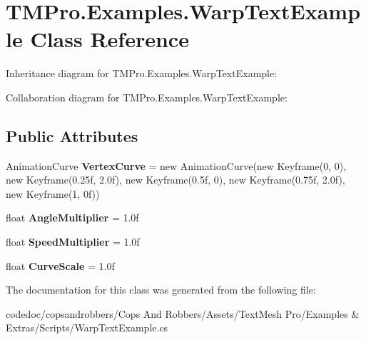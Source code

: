 \hypertarget{classTMPro_1_1Examples_1_1WarpTextExample}{}\section{T\+M\+Pro.\+Examples.\+Warp\+Text\+Example Class Reference}
\label{classTMPro_1_1Examples_1_1WarpTextExample}


Inheritance diagram for T\+M\+Pro.\+Examples.\+Warp\+Text\+Example\+:


Collaboration diagram for T\+M\+Pro.\+Examples.\+Warp\+Text\+Example\+:
\subsection*{Public Attributes}
\begin{DoxyCompactItemize}
\item 
\mbox{\label{classTMPro_1_1Examples_1_1WarpTextExample_aa95fcb47fe116dd3890a0f92106a6602}} 
Animation\+Curve {\bfseries Vertex\+Curve} = new Animation\+Curve(new Keyframe(0, 0), new Keyframe(0.\+25f, 2.\+0f), new Keyframe(0.\+5f, 0), new Keyframe(0.\+75f, 2.\+0f), new Keyframe(1, 0f))
\item 
\mbox{\label{classTMPro_1_1Examples_1_1WarpTextExample_a99104ed4ea6b2676485a40e555388f54}} 
float {\bfseries Angle\+Multiplier} = 1.\+0f
\item 
\mbox{\label{classTMPro_1_1Examples_1_1WarpTextExample_ae02c88a8c8958d8a2343a75897ef400e}} 
float {\bfseries Speed\+Multiplier} = 1.\+0f
\item 
\mbox{\label{classTMPro_1_1Examples_1_1WarpTextExample_aa76e772eda39a25ba1d9f033f6fc516c}} 
float {\bfseries Curve\+Scale} = 1.\+0f
\end{DoxyCompactItemize}


The documentation for this class was generated from the following file\+:\begin{DoxyCompactItemize}
\item 
codedoc/copsandrobbers/\+Cops And Robbers/\+Assets/\+Text\+Mesh Pro/\+Examples \& Extras/\+Scripts/Warp\+Text\+Example.\+cs\end{DoxyCompactItemize}
